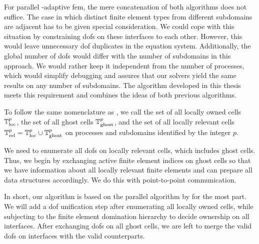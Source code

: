 For parallel \hp-adaptive \gls{fem}, the mere concatenation of both algorithms does not suffice. The case in which distinct finite element types from different subdomains are adjacent has to be given special consideration. We could cope with this situation by constraining \glspl{dof} on these interfaces to each other. However, this would leave unnecessary \gls{dof} duplicates in the equation system. Additionally, the global number of \glspl{dof} would differ with the number of subdomains in this approach. We would rather keep it independent from the number of processes, which would simplify debugging and assures that our solvers yield the same results on any number of subdomains. The algorithm developed in this thesis meets this requirement and combines the ideas of both previous algorithms.

To follow the same nomenclature as \textcite{bangerth2012}, we call the set of all locally owned cells $\mathbb{T}^p_{\text{loc}}$, the set of all ghost cells $\mathbb{T}^p_{\text{ghost}}$, and the set of all locally relevant cells $\mathbb{T}^p_{\text{rel}} = \mathbb{T}^p_{\text{loc}} \cup \mathbb{T}^p_{\text{ghost}}$ on processes and subdomains identified by the integer $p$.

We need to enumerate all \glspl{dof} on locally relevant cells, which includes ghost cells. Thus, we begin by exchanging active finite element indices on ghost cells so that we have information about all locally relevant finite elements and can prepare all data structures accordingly. We do this with point-to-point communication.

In short, our algorithm is based on the parallel algorithm by \textcite[Sec.~3.1]{bangerth2012} for the most part. We will add a \gls{dof} unification step after enumerating all locally owned cells, while subjecting to the finite element domination hierarchy to decide ownership on all interfaces. After exchanging \glspl{dof} on all ghost cells, we are left to merge the valid \glspl{dof} on interfaces with the valid counterparts.

